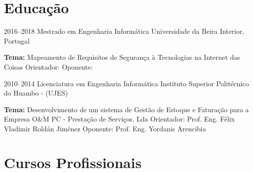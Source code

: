 \section{Educação}

\begin{entrada}

\lista
{2016--2018}
{Mestrado {\normalfont em Engenharia Informática }}
{Universidade da Beira Interior, Portugal}
{\vspace{-0.3cm}}

\dissert
{}
{\textbf{Tema:} Mapeamento de Requisitos de Segurança à Tecnologias na Internet das Coisas}
{Orientador: {\normalfont {}}}
{Oponente: {\normalfont {}}}
{\vspace{-0.3cm}}



\lista
{2010--2014}
{Licenciatura {\normalfont em Engenharia Informática }}
{Instituto Superior Politécnico do Huambo - (UJES)}
{\vspace{-0.3cm}}

\dissert
{}
{\textbf{Tema:} Desenvolvimento de um sistema de Gestão de Estoque e Faturação para a Empresa O\&M PC - Prestação de Serviços, Lda}
{Orientador: {\normalfont Prof. Eng. Félix Vladimir Roldán Jiménez}}
{Oponente: {\normalfont Prof. Eng. Yordanis Arencibia}}
{\vspace{-0.3cm}}

\end{entrada}

\vspace{-1.3cm}
\newpage
\section{Cursos Profissionais}

